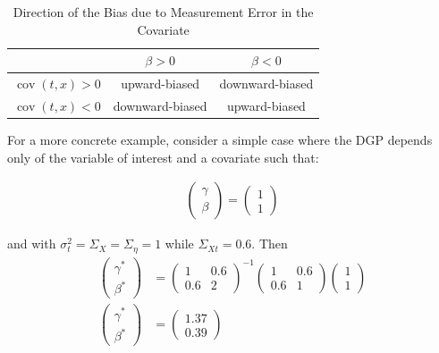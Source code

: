 \documentclass[10pt]{article}
\def\b{\beta}
\begin{document}
        \begin{table}[h!]
            \centering
            \begin{tabular}{|c|c|c|}\hline \hline
              & $\b>0$  & $\b<0$ \\ \hline
             $\operatorname{cov}(t,x)>0$ & upward-biased & downward-biased \\ \hline
             $\operatorname{cov}(t,x)<0$ & downward-biased & upward-biased \\ \hline
            \end{tabular} 
            \caption{Direction of the Bias due to Measurement Error in the Covariate}
            \label{tab:my_label}
        \end{table}
        
         For a more concrete example, consider a simple case where the DGP depends only of the variable of interest and a covariate such that:
        
        \begin{align}
            \left(\begin{array}{l}
        {\gamma} \\
        {\beta}
        \end{array}\right)=\left(\begin{array}{l}
        1 \\
        1
        \end{array}\right)
        \end{align}
        
        and with $\sigma^2_t=\Sigma_X=\Sigma_\eta=1$ while $\Sigma_{Xt}=0.6$. Then
        \begin{align*}
            \left(\begin{array}{l}
        {\gamma}^* \\
        {\beta}^*
        \end{array}\right)& =\left(\begin{array}{cc}
        1 & 0.6 \\
        0.6 & 2
        \end{array}\right)^{-1}\left(\begin{array}{cc}
        1 & 0.6 \\
        0.6 & 1
        \end{array}\right)\left(\begin{array}{l}
        1\\
        1
        \end{array}\right) \\
        \left(\begin{array}{l}
        {\gamma}^* \\
        {\beta}^*
        \end{array}\right)&=\left(\begin{array}{l}
        1.37 \\
        0.39
        \end{array}\right)
        \end{align*}
        
\end{document}
